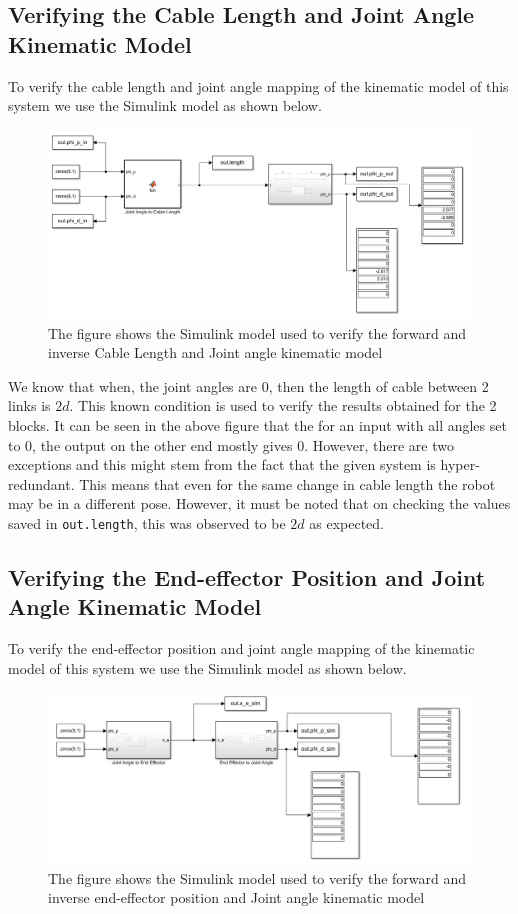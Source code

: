 \documentclass[a4paper,12pt]{report}
\begin{document}
\subsection{Verifying the Cable Length and Joint Angle Kinematic Model}
To verify the cable length and joint angle mapping of the kinematic model of this system we use the Simulink model as shown below.
\begin{figure}[H]
	\includegraphics[width=\textwidth]{images/verification-g2.png}
	\caption{The figure shows the Simulink model used to verify the forward and inverse Cable Length and Joint angle kinematic model}
\end{figure}
We know that when, the joint angles are $ 0 $, then the length of cable between 2 links is $ 2d $. This known condition is used to verify the results obtained for the 2 blocks. It can be seen in the above figure that the for an input with all angles set to 0, the output on the other end mostly gives 0. However, there are two exceptions and this might stem from the fact that the given system is hyper-redundant. This means that even for the same change in cable length the robot may be in a different pose. However, it must be noted that on checking the values saved in \texttt{out.length}, this was observed to be $ 2d $ as expected.

\subsection{Verifying the End-effector Position and Joint Angle Kinematic Model}
To verify the end-effector position and joint angle mapping of the kinematic model of this system we use the Simulink model as shown below.
\begin{figure}[H]
	\includegraphics[width=\textwidth]{images/verification-g1.png}
	\caption{The figure shows the Simulink model used to verify the forward and inverse end-effector position and Joint angle kinematic model}
\end{figure}
\end{document}
